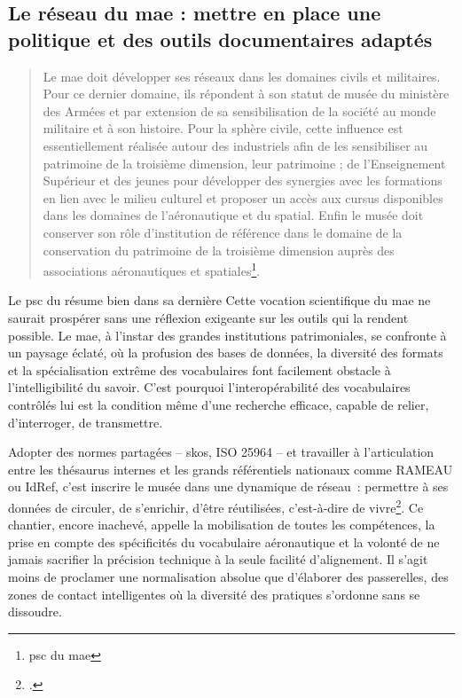 \subsection{Le réseau du \ac{mae} : mettre en place une politique et des outils documentaires adaptés}

\begin{quote}
	\og Le \acf{mae} doit développer ses réseaux \textelp{} dans les domaines civils et militaires. Pour ce dernier domaine, ils répondent à son statut de musée du ministère des Armées et par extension de sa sensibilisation de la société au monde militaire et à son histoire.
	Pour la sphère civile, cette influence est essentiellement réalisée autour des industriels afin de les sensibiliser au patrimoine de la troisième dimension, leur patrimoine ; de l’Enseignement Supérieur et des jeunes pour développer des synergies avec les formations en lien avec le milieu culturel et proposer un accès aux cursus disponibles dans les domaines de l’aéronautique et du spatial. Enfin \textelp{} le musée doit conserver son rôle d’institution de référence dans le domaine de la conservation du patrimoine de la troisième dimension auprès des associations aéronautiques et spatiales\footnote{\ac{psc} du \ac{mae}}.\fg
\end{quote}

Le \ac{psc} du \mae résume bien dans sa dernière
Cette vocation scientifique du \ac{mae} ne saurait prospérer sans une réflexion exigeante sur les outils qui la rendent possible. Le \ac{mae}, à l’instar des grandes institutions patrimoniales, se confronte à un paysage éclaté, où la profusion des bases de données, la diversité des formats et la spécialisation extrême des vocabulaires font facilement obstacle à l’intelligibilité du savoir. C’est pourquoi l’interopérabilité des vocabulaires contrôlés lui est la condition même d’une recherche efficace, capable de relier, d’interroger, de transmettre.

Adopter des normes partagées – \ac{skos}, ISO 25964 – et travailler à l’articulation entre les thésaurus internes et les grands référentiels nationaux comme RAMEAU ou IdRef, c’est inscrire le musée dans une dynamique de réseau : permettre à ses données de circuler, de s’enrichir, d’être réutilisées, c’est-à-dire de vivre\footcite{hudonISO25964Pour2012a,chichereau_normes_2007,nouvel_thesaurus_2019}. Ce chantier, encore inachevé, appelle la mobilisation de toutes les compétences, la prise en compte des spécificités du vocabulaire aéronautique et la volonté de ne jamais sacrifier la précision technique à la seule facilité d’alignement. Il s’agit moins de proclamer une normalisation absolue que d’élaborer des passerelles, des zones de contact intelligentes où la diversité des pratiques s’ordonne sans se dissoudre.

